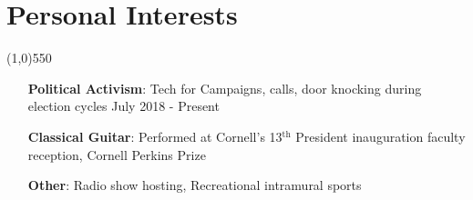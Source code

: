 \documentclass[11pt]{article} %
\begin{document}
	\vspace{+1ex}
	\section*{Personal Interests}
	\vspace{-7ex}
	\begin{center}
    \line(1,0){550}
    \end{center}
    \vspace{-2ex}
	\begin{itemize}
		\item[\textbf{Political Activism}:] Tech for Campaigns, calls, door knocking during election cycles \hfill July 2018 - Present 
		\item[\textbf{Classical Guitar}:] Performed at Cornell's 13$^\textrm{th}$ President inauguration faculty reception, Cornell Perkins Prize 
		\item[\textbf{Other}:] Radio show hosting, Recreational intramural sports
	\end{itemize}
	
\end{document}
